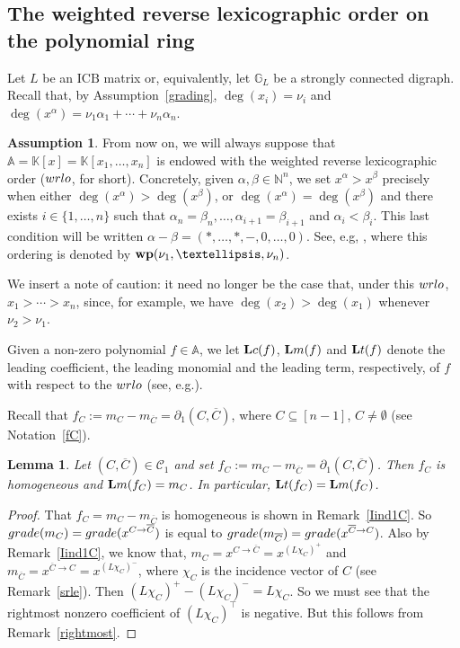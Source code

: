 \documentclass[10pt]{amsart}
\newcommand{\eg}{e.g.}
\newcommand{\mbn}{\mbox{$\mathbb{N}$}}
\newcommand{\mbk}{\mbox{$\mathbb{K}$}}
\newcommand{\mba}{\mbox{$\mathbb{A}$}}
\newcommand{\mbg}{\mbox{$\mathbb{G}$}}
\newcommand{\lc}{\mbox{${\bf L}{\rm c}$}}
\newcommand{\lm}{\mbox{${\bf L}{\rm m}$}}
\newcommand{\lt}{\mbox{${\bf L}{\rm t}$}}
\newcommand{\mcc}{\mbox{$\mathcal{C}$}}
\newcommand{\icb}{\mbox{$\mathrm{ICB}$}}
\newcommand{\dif}{\mbox{$\partial$}}
\newcommand{\grade}{\mbox{${\rm grade}$}}
\newcommand{\wrlo}{\mbox{${\rm wrlo}$}}
\newtheorem{lemma}[cdrthm]{Lemma}
\theoremstyle{definition}
\newtheorem{assumption}[cdrthm]{Assumption}
\theoremstyle{remark}
\begin{document}
\subsection{The weighted reverse lexicographic order on the polynomial 
ring}

 Let $L$ be an $\icb$ matrix or, equivalently, let $\mbg_L$
be a strongly connected digraph. Recall that, by
Assumption~\ref{grading}, $\deg(x_i)=\nu_i$ and
$\deg(x^\alpha)=\nu_1\alpha_1+\cdots +\nu_n\alpha_n$.

\begin{assumption}\label{wrlo}
From now on, we will always suppose that $\mba=\mbk[x]=\mbk[x_1,\ldots
  ,x_n]$ is endowed with the weighted reverse lexicographic order
($\wrlo$, for short). Concretely, given $\alpha,\beta\in\mbn^{n}$, we
set $x^\alpha>x^\beta$ precisely when either
$\deg(x^\alpha)>\deg(x^\beta)$, or $\deg(x^\alpha)=\deg(x^\beta)$ and
there exists $i\in\{1,\ldots ,n\}$ such that $\alpha_n=\beta_n,\ldots
,\alpha_{i+1}=\beta_{i+1}$ and $\alpha_i<\beta_i$. This last
condition will be written $\alpha-\beta=(*,\ldots,*,-,0,\ldots
,0)$. See, e.g, \cite[p.~13]{gp}, where this ordering is denoted by
${\bf wp}(\nu_1,\ldots ,\nu_n)$.
\end{assumption}

We insert a note of caution: it need no longer be the case that, under
this $\wrlo$, $x_1>\cdots >x_n$, since, for example, we have
$\deg(x_2)>\deg(x_1)$ whenever $\nu_2>\nu_1$.

Given a non-zero polynomial $f\in \mba$, we let $\lc(f)$, $\lm(f)$
and $\lt(f)$ denote the leading coefficient, the leading monomial
and the leading term, respectively, of $f$ with respect to the
$\wrlo$ (see, \eg \cite[\S~2.2,~Definition~7]{clo}).

Recall that $f_C:=m_C-m_{\overline{C}}=\dif_1(C,\overline{C})$, where
$C\subseteq [n-1]$, $C\neq\emptyset$ (see Notation~\ref{fC}).

\begin{lemma}\label{lm}
Let $(C,\overline{C})\in\mcc_1$ and set
$f_C:=m_C-m_{\overline{C}}=\dif_1(C,\overline{C})$. Then $f_C$ is
homogeneous and $\lm(f_C)=m_C$. In particular, $\lt(f_C)=\lm(f_C)$.
\end{lemma}
\begin{proof}
That $f_C=m_C-m_{\overline{C}}$ is homogeneous is shown in
Remark~\ref{Iind1C}. So $\grade(m_C)=\grade(x^{C\to\overline{C}})$ is
equal to $\grade(m_{\overline{C}})=\grade(x^{\overline{C}\to
  C})$. Also by Remark~\ref{Iind1C}, we know that,
$m_C=x^{C\to\overline{C}}=x^{(L\chi_C)^+}$ and
$m_{\overline{C}}=x^{\overline{C}\to C}=x^{(L\chi_C)^-}$, where
$\chi_C$ is the incidence vector of $C$ (see Remark~\ref{srle}). Then
$(L\chi_C)^+-(L\chi_C)^-=L\chi_C$. So we must see that the rightmost
nonzero coefficient of $(L\chi_C)^{\top}$ is negative. But this
follows from Remark~\ref{rightmost}.
\end{proof}
\end{document}
